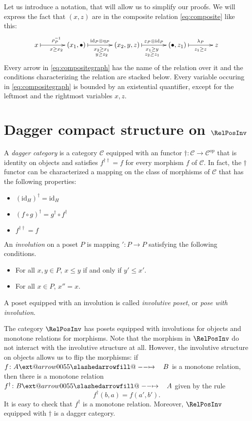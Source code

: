 \documentclass{article}
\makeatletter
\theoremstyle{definition}
\newcommand{\id}{\mathrm{id}}
\newcommand{\C}{\mathcal{C}}
\newcommand{\sto}{\xslashedrightarrow{\hskip 1pc}}
\def\slashedarrowfill@#1#2#3#4#5{%
  $\m@th\thickmuskip0mu\medmuskip\thickmuskip\thinmuskip\thickmuskip
  \relax#5#1\mkern-7mu%
  \cleaders\hbox{$#5\mkern-2mu#2\mkern-2mu$}\hfill
  \mathclap{#3}\mathclap{#2}%
  \cleaders\hbox{$#5\mkern-2mu#2\mkern-2mu$}\hfill
  \mkern-7mu#4$%
}
\def\rightslashedarrowfill@{%
  \slashedarrowfill@\relbar\relbar\mapstochar\rightarrow}
\newcommand\xslashedrightarrow[2][]{%
  \ext@arrow 0055{\rightslashedarrowfill@}{#1}{#2}}
\makeatother
\begin{document}
Let us introduce a notation, that will allow us to simplify our proofs.
We will express the fact that $(x,z)$ are in the composite relation
\eqref{eq:composite} like this:
\begin{equation}
\label{eq:compositegraph}
\xymatrix@C=3pc{
x
	\ar@{|->}[r]^{\rho^{-1}_P}_{x\geq x_2}
&
(x_1,\bullet)
	\ar@{|->}[r]^-{\id_P\otimes\eta_P}_{\substack{x_2\geq x_1\\y\geq z_2}}
&
(x_2,y,z)
	\ar@{|->}[r]^-{\varepsilon_P\otimes\id_P}_{\substack{x_1\geq y\\z_2\geq z_1}}
&
(\bullet,z_1)
	\ar@{|->}[r]^-{\lambda_P}_-{z_1\geq z}
&
z
}
\end{equation}
Every arrow in \eqref{eq:compositegraph} has the name of the relation
over it and the conditions characterizing the relation are stacked below. 
Every variable occuring in \eqref{eq:compositegraph} is bounded by an
existential quantifier, except for the leftmost and the rightmost variables $x,z$.

\section{Dagger compact structure on $\RelPosInv$}
A {\em dagger category} is a category $\C$ 
equipped with an functor $\dag\colon\C\to\C^{op}$ that is identity
on objects and satisfies $f^{\dag\dag}=f$ for every morphism $f$ of $\C$. In
fact, the $\dag$ functor can be characterized a mapping on the class of morphisms
of $\C$ that has the following properties:
\begin{itemize}
\item $(\id_H)^\dag=\id_H$
\item $(f\circ g )^\dag=g^\dag\circ f^\dag$
\item $f^{\dag\dag}=f$
\end{itemize}

An {\em involution} on a poset $P$ is mapping $'\colon P\to P$ satisfying the following
conditions.
\begin{itemize}
\item For all $x,y\in P$, $x≤y$ if and only if $y'≤x'$.
\item For all $x\in P$, $x''=x$.
\end{itemize}
A poset equipped with an involution is called {\em involutive poset}, or
{\em pose with involution}.

The category $\RelPosInv$ has posets equipped with involutions for objects and
monotone relations for morphisms. Note that the morphism in $\RelPosInv$ do not
interact with the involutive structure at all. However, the involutive structure
on objects allows us to flip the morphisms: if $f\colon A\sto B$ is a monotone
relation, then there is a monotone relation $f^\dag\colon B\sto A$ given by the
rule
$$
f^\dag(b,a)=f(a',b').
$$ 
It is easy to check that $f^\dag$ is a monotone relation.
Moreover, $\RelPosInv$ equipped with $\dag$ is a dagger category.
\end{document}
